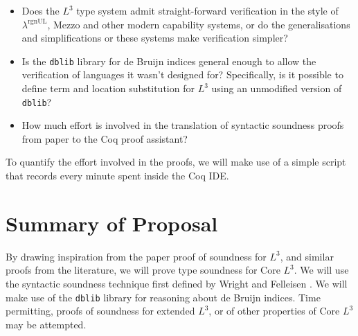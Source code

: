 \documentclass[]{unswthesis}
\newcommand{\rgnUL}{$\lambda^\text{rgnUL}$\text{ }}
\begin{document}
\begin{itemize}
\item Does the $L^3$ type system admit straight-forward verification in the style of \rgnUL, Mezzo and other modern capability systems, or do the generalisations and simplifications or these systems make verification simpler?
\item Is the \texttt{dblib} library for de Bruijn indices general enough to allow the verification of languages it wasn't designed for? Specifically, is it possible to define term and location substitution for $L^3$ using an unmodified version of \texttt{dblib}?
\item How much effort is involved in the translation of syntactic soundness proofs from paper to the Coq proof assistant?
\end{itemize}

To quantify the effort involved in the proofs, we will make use of a simple script that records every minute spent inside the Coq IDE.

\section{Summary of Proposal}

By drawing inspiration from the paper proof of soundness for $L^3$, and similar proofs from the literature, we will prove type soundness for Core $L^3$. We will use the syntactic soundness technique first defined by Wright and Felleisen \cite{wright94}. We will make use of the \texttt{dblib} library \cite{dblib13} for reasoning about de Bruijn indices. Time permitting, proofs of soundness for extended $L^3$, or of other properties of Core $L^3$ may be attempted.

\backmatter
\pagebreak


\end{document}
